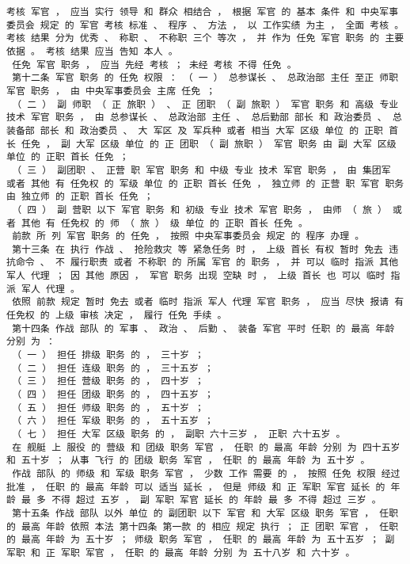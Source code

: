 \documentclass{article}
\begin{document}
\begin{Verbatim}[commandchars=\\\{\}]
 考核 军官 ， 应当 实行 领导 和 群众 相结合 ， 根据 军官 的 基本 条件 和 中央军事委员会 规定 的 军官 考核 标准 、 程序 、 方法 ， 以 工作实绩 为主 ， 全面 考核 。 考核 结果 分为 优秀 、 称职 、 不称职 三个 等次 ， 并 作为 任免 军官 职务 的 主要 依据 。 考核 结果 应当 告知 本人 。 
 任免 军官 职务 ， 应当 先经 考核 ； 未经 考核 不得 任免 。 
 第十二条 军官 职务 的 任免 权限 ： （ 一 ） 总参谋长 、 总政治部 主任 至正 师职 军官 职务 ， 由 中央军事委员会 主席 任免 ； 
 （ 二 ） 副 师职 （ 正 旅职 ） 、 正 团职 （ 副 旅职 ） 军官 职务 和 高级 专业 技术 军官 职务 ， 由 总参谋长 、 总政治部 主任 、 总后勤部 部长 和 政治委员 、 总装备部 部长 和 政治委员 、 大 军区 及 军兵种 或者 相当 大军 区级 单位 的 正职 首长 任免 ， 副 大军 区级 单位 的 正 团职 （ 副 旅职 ） 军官 职务 由 副 大军 区级 单位 的 正职 首长 任免 ； 
 （ 三 ） 副团职 、 正营 职 军官 职务 和 中级 专业 技术 军官 职务 ， 由 集团军 或者 其他 有 任免权 的 军级 单位 的 正职 首长 任免 ， 独立师 的 正营 职 军官 职务 由 独立师 的 正职 首长 任免 ； 
 （ 四 ） 副 营职 以下 军官 职务 和 初级 专业 技术 军官 职务 ， 由师 （ 旅 ） 或者 其他 有 任免权 的 师 （ 旅 ） 级 单位 的 正职 首长 任免 。 
 前款 所 列 军官 职务 的 任免 ， 按照 中央军事委员会 规定 的 程序 办理 。 
 第十三条 在 执行 作战 、 抢险救灾 等 紧急任务 时 ， 上级 首长 有权 暂时 免去 违抗命令 、 不 履行职责 或者 不称职 的 所属 军官 的 职务 ， 并 可以 临时 指派 其他 军人 代理 ； 因 其他 原因 ， 军官 职务 出现 空缺 时 ， 上级 首长 也 可以 临时 指派 军人 代理 。 
 依照 前款 规定 暂时 免去 或者 临时 指派 军人 代理 军官 职务 ， 应当 尽快 报请 有 任免权 的 上级 审核 决定 ， 履行 任免 手续 。 
 第十四条 作战 部队 的 军事 、 政治 、 后勤 、 装备 军官 平时 任职 的 最高 年龄 分别 为 ： 
 （ 一 ） 担任 排级 职务 的 ， 三十岁 ； 
 （ 二 ） 担任 连级 职务 的 ， 三十五岁 ； 
 （ 三 ） 担任 营级 职务 的 ， 四十岁 ； 
 （ 四 ） 担任 团级 职务 的 ， 四十五岁 ； 
 （ 五 ） 担任 师级 职务 的 ， 五十岁 ； 
 （ 六 ） 担任 军级 职务 的 ， 五十五岁 ； 
 （ 七 ） 担任 大军 区级 职务 的 ， 副职 六十三岁 ， 正职 六十五岁 。 
 在 舰艇 上 服役 的 营级 和 团级 职务 军官 ， 任职 的 最高 年龄 分别 为 四十五岁 和 五十岁 ； 从事 飞行 的 团级 职务 军官 ， 任职 的 最高 年龄 为 五十岁 。 
 作战 部队 的 师级 和 军级 职务 军官 ， 少数 工作 需要 的 ， 按照 任免 权限 经过 批准 ， 任职 的 最高 年龄 可以 适当 延长 ， 但是 师级 和 正 军职 军官 延长 的 年龄 最 多 不得 超过 五岁 ， 副 军职 军官 延长 的 年龄 最 多 不得 超过 三岁 。 
 第十五条 作战 部队 以外 单位 的 副团职 以下 军官 和 大军 区级 职务 军官 ， 任职 的 最高 年龄 依照 本法 第十四条 第一款 的 相应 规定 执行 ； 正 团职 军官 ， 任职 的 最高 年龄 为 五十岁 ； 师级 职务 军官 ， 任职 的 最高 年龄 为 五十五岁 ； 副 军职 和 正 军职 军官 ， 任职 的 最高 年龄 分别 为 五十八岁 和 六十岁 。 

\end{Verbatim}
\end{document}
